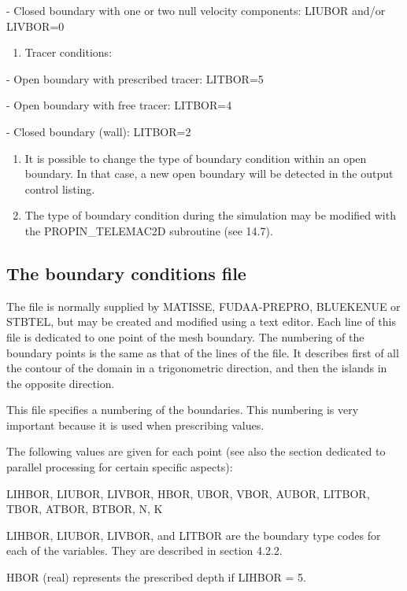  - Closed boundary with one or two null velocity components: LIUBOR and/or LIVBOR=0

\begin{enumerate}
\item  Tracer conditions:
\end{enumerate}

 - Open boundary with prescribed tracer: LITBOR=5

 - Open boundary with free tracer: LITBOR=4

 - Closed boundary (wall): LITBOR=2


\begin{enumerate}
\item \underbar{ }It is possible to change the type of boundary condition within an open boundary. In that case, a new open boundary will be detected in the output control listing.

\item  The type of boundary condition during the simulation may be modified with the PROPIN\_TELEMAC2D subroutine (see 14.7).
\end{enumerate}


\subsection{ The boundary conditions file}

 The file is normally supplied by MATISSE, FUDAA-PREPRO, BLUEKENUE or STBTEL, but may be created and modified using a text editor. Each line of this file is dedicated to one point of the mesh boundary. The numbering of the boundary points is the same as that of the lines of the file. It describes first of all the contour of the domain in a trigonometric direction, and then the islands in the opposite direction.

 This file specifies a numbering of the boundaries. This numbering is very important because it is used when prescribing values.

 The following values are given for each point (see also the section dedicated to parallel processing for certain specific aspects):

 LIHBOR, LIUBOR, LIVBOR, HBOR, UBOR, VBOR, AUBOR, LITBOR, TBOR, ATBOR, BTBOR, N, K

 LIHBOR, LIUBOR, LIVBOR, and LITBOR are the boundary type codes for each of the variables. They are described in section 4.2.2.

 HBOR (real) represents the prescribed depth if LIHBOR = 5.

